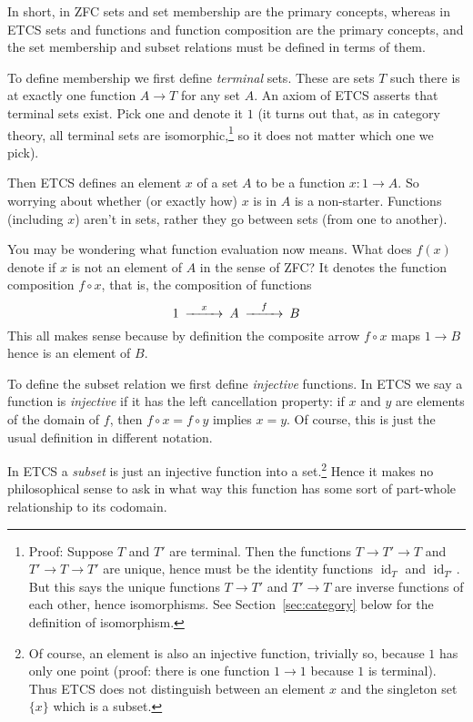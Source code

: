 \documentclass[11pt]{article}
\DeclareMathOperator{\idfun}{id}
\begin{document}
In short, in ZFC sets and set membership are the primary concepts,
whereas in ETCS sets and
functions and function composition are the primary concepts, and the
set membership and subset relations must be defined in terms of them.

To define membership \citep[Section~1]{leinster}
we first define \emph{terminal} sets.
These are sets $T$ such there is at exactly one function $A \to T$ for any
set $A$.  An axiom of ETCS asserts that terminal sets exist.
Pick one and denote it $1$ (it turns out that, as in category theory,
all terminal sets are isomorphic,\footnote{Proof: Suppose $T$ and $T'$ are
terminal.  Then the functions $T \to T' \to T$ and $T' \to T \to T'$ are
unique, hence must be the identity functions $\idfun_T$ and $\idfun_{T'}$.
But this says the unique functions $T \to T'$ and $T' \to T$ are
inverse functions of each other, hence isomorphisms.
\label{foot:terminal}
See Section~\ref{sec:category} below for the definition of isomorphism.}
so it does not matter which one we pick).

Then ETCS defines an element $x$ of a set $A$ to be a function $x : 1 \to A$.
So worrying about whether (or exactly how) $x$ is in $A$ is a non-starter.
Functions (including $x$) aren't in sets, rather they go between sets
(from one to another).

You may be wondering what function evaluation now means.  What does $f(x)$
denote if $x$ is not an element of $A$ in the sense of ZFC?  It denotes
the function composition $f \circ x$, that is, the composition of functions
$$
\begin{CD}
   1 @>x>> A @>f>> B
\end{CD}
$$
This all makes sense because by definition the composite arrow $f \circ x$
maps $1 \to B$ hence is an element of $B$.

To define the subset relation \citep[Discussion of Axiom~8]{leinster}
we first define \emph{injective} functions.
In ETCS we say a function is \emph{injective} if
it has the left cancellation property: if $x$ and $y$ are elements of
the domain of $f$, then $f \circ x = f \circ y$ implies $x = y$.
Of course, this is just the usual definition in different notation.

In ETCS a \emph{subset} is just an injective function into a set.\footnote{
Of course, an element is also an injective function, trivially so, because
$1$ has only one point (proof: there is one function $1 \to 1$ because $1$
is terminal).  Thus ETCS does not distinguish between an element $x$ and
the singleton set $\{x\}$ which is a subset.}
Hence it makes no philosophical sense to ask in what way this function
has some sort of part-whole relationship to its codomain.
\end{document}
